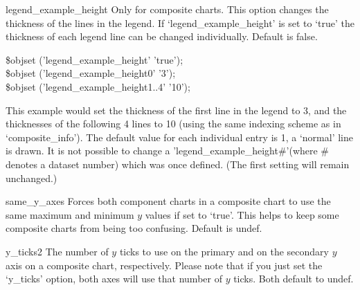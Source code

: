\begin{AttrDecl}{legend\_example\_height}
Only for composite charts. This option changes the thickness of the
lines in the legend. If `legend\_example\_height' is set to `true' the
thickness of each legend line can be changed individually. Default is
false. \Eg
\begin{SmallExample}
\$obj\deref set ('legend\_example\_height'     \fatcomma 'true');\\
\$obj\deref set ('legend\_example\_height0'    \fatcomma '3');\\
\$obj\deref set ('legend\_example\_height1..4' \fatcomma '10');
\end{SmallExample}

This example would set the thickness of the first line in the legend to
3, and the thicknesses of the following 4 lines to 10 (using the same
indexing scheme as in `composite\_info'). The default value for each
individual entry is 1, \ie a `normal' line is drawn. It is not possible
to change a 'legend\_example\_height\#'(where \# denotes a dataset
number) which was once defined. (The first setting will remain
unchanged.)
\end{AttrDecl}

\begin{AttrDecl}{same\_y\_axes}
Forces both component charts in a composite chart to use the same
maximum and minimum $y$ values if set to `true'. This helps to keep
some composite charts from being too confusing. Default is undef.
\end{AttrDecl}

\begin{AttrDecl}{y\_ticks2}
The number of $y$ ticks to use on the primary and on the secondary $y$
axis on a composite chart, respectively. Please note that if you just
set the `y\_ticks' option, both axes will use that number of $y$ ticks.
Both default to undef.
\end{AttrDecl}
